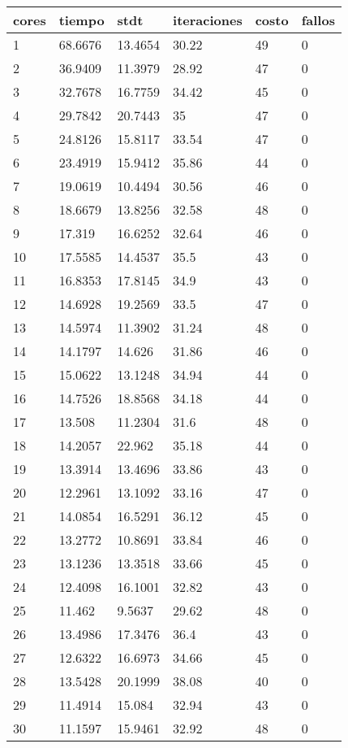 \begin{tabular}{llllll}
cores & tiempo & stdt & iteraciones & costo & fallos \\ 
\hline 
1 & 68.6676 & 13.4654 & 30.22 & 49 & 0 \\ 
2 & 36.9409 & 11.3979 & 28.92 & 47 & 0 \\ 
3 & 32.7678 & 16.7759 & 34.42 & 45 & 0 \\ 
4 & 29.7842 & 20.7443 & 35 & 47 & 0 \\ 
5 & 24.8126 & 15.8117 & 33.54 & 47 & 0 \\ 
6 & 23.4919 & 15.9412 & 35.86 & 44 & 0 \\ 
7 & 19.0619 & 10.4494 & 30.56 & 46 & 0 \\ 
8 & 18.6679 & 13.8256 & 32.58 & 48 & 0 \\ 
9 & 17.319 & 16.6252 & 32.64 & 46 & 0 \\ 
10 & 17.5585 & 14.4537 & 35.5 & 43 & 0 \\ 
11 & 16.8353 & 17.8145 & 34.9 & 43 & 0 \\ 
12 & 14.6928 & 19.2569 & 33.5 & 47 & 0 \\ 
13 & 14.5974 & 11.3902 & 31.24 & 48 & 0 \\ 
14 & 14.1797 & 14.626 & 31.86 & 46 & 0 \\ 
15 & 15.0622 & 13.1248 & 34.94 & 44 & 0 \\ 
16 & 14.7526 & 18.8568 & 34.18 & 44 & 0 \\ 
17 & 13.508 & 11.2304 & 31.6 & 48 & 0 \\ 
18 & 14.2057 & 22.962 & 35.18 & 44 & 0 \\ 
19 & 13.3914 & 13.4696 & 33.86 & 43 & 0 \\ 
20 & 12.2961 & 13.1092 & 33.16 & 47 & 0 \\ 
21 & 14.0854 & 16.5291 & 36.12 & 45 & 0 \\ 
22 & 13.2772 & 10.8691 & 33.84 & 46 & 0 \\ 
23 & 13.1236 & 13.3518 & 33.66 & 45 & 0 \\ 
24 & 12.4098 & 16.1001 & 32.82 & 43 & 0 \\ 
25 & 11.462 & 9.5637 & 29.62 & 48 & 0 \\ 
26 & 13.4986 & 17.3476 & 36.4 & 43 & 0 \\ 
27 & 12.6322 & 16.6973 & 34.66 & 45 & 0 \\ 
28 & 13.5428 & 20.1999 & 38.08 & 40 & 0 \\ 
29 & 11.4914 & 15.084 & 32.94 & 43 & 0 \\ 
30 & 11.1597 & 15.9461 & 32.92 & 48 & 0 \\ 

\end{tabular}
